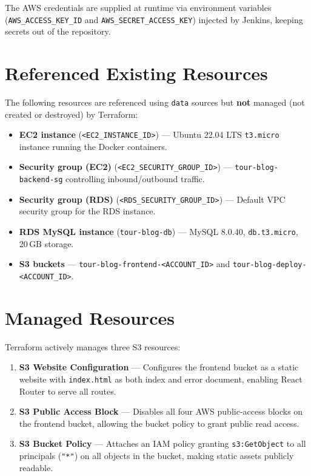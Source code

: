 \documentclass[12pt,a4paper]{report}
\begin{document}
The AWS credentials are supplied at runtime via environment variables (\texttt{AWS\_ACCESS\_KEY\_ID} and \texttt{AWS\_SECRET\_ACCESS\_KEY}) injected by Jenkins, keeping secrets out of the repository.

\section{Referenced Existing Resources}

The following resources are referenced using \texttt{data} sources but \textbf{not} managed (not created or destroyed) by Terraform:

\begin{itemize}[leftmargin=2em]
  \item \textbf{EC2 instance} (\texttt{<EC2_INSTANCE_ID>}) — Ubuntu 22.04 LTS \texttt{t3.micro} instance running the Docker containers.
  \item \textbf{Security group (EC2)} (\texttt{<EC2_SECURITY_GROUP_ID>}) — \texttt{tour-blog-backend-sg} controlling inbound/outbound traffic.
  \item \textbf{Security group (RDS)} (\texttt{<RDS_SECURITY_GROUP_ID>}) — Default VPC security group for the RDS instance.
  \item \textbf{RDS MySQL instance} (\texttt{tour-blog-db}) — MySQL 8.0.40, \texttt{db.t3.micro}, 20\,GB storage.
  \item \textbf{S3 buckets} — \texttt{tour-blog-frontend-<ACCOUNT_ID>} and \texttt{tour-blog-deploy-<ACCOUNT_ID>}.
\end{itemize}

\section{Managed Resources}

Terraform actively manages three S3 resources:

\begin{enumerate}[leftmargin=2em]
  \item \textbf{S3 Website Configuration} — Configures the frontend bucket as a static website with \texttt{index.html} as both index and error document, enabling React Router to serve all routes.
  \item \textbf{S3 Public Access Block} — Disables all four AWS public-access blocks on the frontend bucket, allowing the bucket policy to grant public read access.
  \item \textbf{S3 Bucket Policy} — Attaches an IAM policy granting \texttt{s3:GetObject} to all principals (\texttt{"*"}) on all objects in the bucket, making static assets publicly readable.
\end{enumerate}
\end{document}
